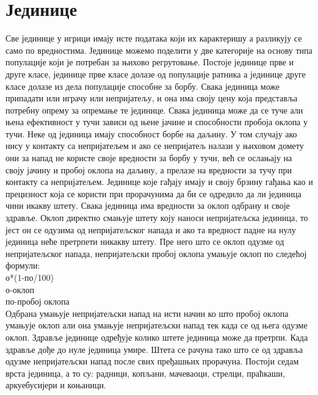 \documentclass[11pt,a4paper]{article}
\begin{document}
\section{Јединице}
Све јединице у игрици имају исте података који их карактеришу а разликују се само по вредностима. Јединице можемо поделити у две категорије на основу типа популације који је потребан за њихово регрутовање. Постоје јединице прве и друге класе, јединице прве класе долазе од популације ратника а јединице друге класе долазе из дела популације способне за борбу. Свака јединица може припадати или играчу или непријатељу, и она има своју цену која представља потребну опрему за опремање те јединице. Свака јединица може да се туче али њена ефективност у тучи зависи од њене јачине и способности пробоја оклопа у тучи. Неке од јединица имају способност борбе на даљину. У том случају ако нису у контакту са непријатељем и ако се непријатељ налази у њиховом домету они за напад не користе своје вредности за борбу у тучи, већ се ослањају на своју јачину и пробој оклопа на даљину, а прелазе на вредности за тучу при контакту са непријатељем. Јединице које гађају имају и своју брзину гађања као и прецизност која се користи при прорачунима да би се одредило да ли јединица чини икакву штету. Свака јединица има вредности за оклоп одбрану и своје здравље. Оклоп директно смањује штету коју наноси непријатељска јединица, то јест он се одузима од непријатељског напада и ако та вредност падне на нулу јединица неће претрпети никакву штету. Пре него што се оклоп одузме од непријатељског напада, непријатељски пробој оклопа умањује оклоп по следећој формули:
\\ о*(1-по/100)
\\ о-оклоп 
\\ по-пробој оклопа
\\ Одбрана умањује непријатељски напад на исти начин ко што пробој оклопа умањује оклоп али она умањује непријатељски напад тек када се од њега одузме оклоп. Здравље јединице одређује колико штете јединица може да претрпи. Када здравље дође до нуле јединица умире. Штета се рачуна тако што се од здравља одузме непријатељски напад после свих пређашњих прорачуна. Постоји седам врста јединица, а то су: радници, копљани, мачеваоци, стрелци, праћкаши, аркуебусијери и коњаници.
\end{document}
